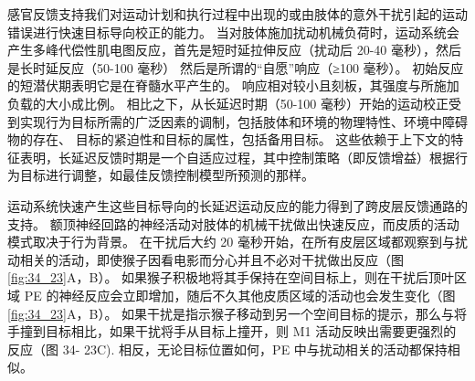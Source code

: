 感官反馈支持我们对运动计划和执行过程中出现的或由肢体的意外干扰引起的运动错误进行快速目标导向校正的能力。 当对肢体施加扰动机械负荷时，运动系统会产生多峰代偿性肌电图反应，首先是短时延拉伸反应（扰动后 20-40 毫秒），然后是长时延反应（50-100 毫秒） 然后是所谓的“自愿”响应（≥100 毫秒）。 初始反应的短潜伏期表明它是在脊髓水平产生的。 响应相对较小且刻板，其强度与所施加负载的大小成比例。 相比之下，从长延迟时期（50-100 毫秒）开始的运动校正受到实现行为目标所需的广泛因素的调制，包括肢体和环境的物理特性、环境中障碍物的存在、 目标的紧迫性和目标的属性，包括备用目标。 这些依赖于上下文的特征表明，长延迟反馈时期是一个自适应过程，其中控制策略（即反馈增益）根据行为目标进行调整，如最佳反馈控制模型所预测的那样。

运动系统快速产生这些目标导向的长延迟运动反应的能力得到了跨皮层反馈通路的支持。 额顶神经回路的神经活动对肢体的机械干扰做出快速反应，而皮质的活动模式取决于行为背景。 
在干扰后大约 20 毫秒开始，在所有皮层区域都观察到与扰动相关的活动，即使猴子因看电影而分心并且不必对干扰做出反应（图\ref{fig:34_23}A，B）。 
如果猴子积极地将其手保持在空间目标上，则在干扰后顶叶区域 PE 的神经反应会立即增加，随后不久其他皮质区域的活动也会发生变化（图 \ref{fig:34_23}A，B）。 如果干扰是指示猴子移动到另一个空间目标的提示，那么与将手撞到目标相比，如果干扰将手从目标上撞开，则 M1 活动反映出需要更强烈的反应（图 34- 23C). 相反，无论目标位置如何，PE 中与扰动相关的活动都保持相似。

